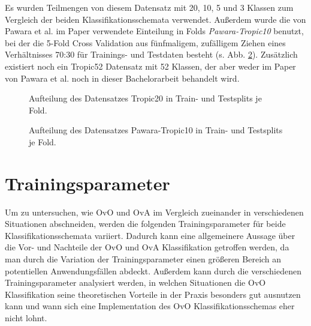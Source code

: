 Es wurden Teilmengen von diesem Datensatz mit 20, 10, 5 und 3 Klassen zum Vergleich der beiden Klassifikationsschemata verwendet. Außerdem wurde die von Pawara et al. im Paper \cite{pawaraPaper} verwendete Einteilung in Folds \textit{Pawara-Tropic10} \cite{pawaraWebsiteDatensaetze} benutzt, bei der die 5-Fold Cross Validation aus fünfmaligem, zufälligem Ziehen eines Verhältnisses 70:30 für Trainings- und Testdaten besteht (s. Abb. \ref{fig:pawaraTropic10Zusammensetzung}).
Zusätzlich existiert noch ein Tropic52 Datensatz \cite{pawaraWebsiteDatensaetze} mit 52 Klassen, der aber weder im Paper von Pawara et al. \cite{pawaraPaper} noch in dieser Bachelorarbeit behandelt wird.

\begin{figure}[H]
\begin{adjustbox}{width=1.2\textwidth, center}

\end{adjustbox}
\caption{Aufteilung des Datensatzes Tropic20 \cite{pawaraWebsiteDatensaetze} in Train- und Testsplits je Fold.}
\label{fig:tropic20Zusammensetzung}
\end{figure}
\begin{figure}[H]
\begin{adjustbox}{width=1.2\textwidth, center}

\end{adjustbox}
\caption{Aufteilung des Datensatzes Pawara-Tropic10 \cite{pawaraWebsiteDatensaetze} in Train- und Testsplits je Fold.}
\label{fig:pawaraTropic10Zusammensetzung}
\end{figure}


\section{Trainingsparameter}
\label{ch:methodik_parameter}
Um zu untersuchen, wie OvO und OvA im Vergleich zueinander in verschiedenen Situationen abschneiden, werden die folgenden Trainingsparameter für beide Klassifikationsschemata variiert.
Dadurch kann eine allgemeinere Aussage über die Vor- und Nachteile der OvO und OvA Klassifikation getroffen werden, da man durch die Variation der Trainingsparameter einen größeren Bereich an potentiellen Anwendungsfällen abdeckt.
Außerdem kann durch die verschiedenen Trainingsparameter analysiert werden, in welchen Situationen die OvO Klassifikation seine theoretischen Vorteile in der Praxis besonders gut ausnutzen kann und wann sich eine Implementation des OvO Klassifikationsschemas eher nicht lohnt.


